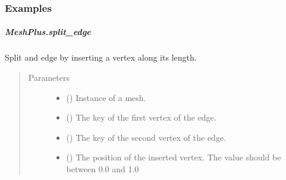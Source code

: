 \documentclass[letterpaper,10pt,english]{sphinxmanual}
\begin{document}
\begin{fulllineitems}
\begin{fulllineitems}
\subsubsection*{Examples}

\begin{sphinxVerbatim}[commandchars=\\\{\}]
\end{sphinxVerbatim}

\end{fulllineitems}



\subparagraph{MeshPlus.split\_edge}
\label{\detokenize{api/generated/directional_clustering.mesh.MeshPlus.split_edge:meshplus-split-edge}}\label{\detokenize{api/generated/directional_clustering.mesh.MeshPlus.split_edge::doc}}

\begin{fulllineitems}
\label{\detokenize{api/generated/directional_clustering.mesh.MeshPlus.split_edge:directional_clustering.mesh.MeshPlus.split_edge}}
Split and edge by inserting a vertex along its length.
\begin{quote}\begin{description}
\item[{Parameters}] \leavevmode\begin{itemize}
\item {} 
 () \textendash{} Instance of a mesh.

\item {} 
 () \textendash{} The key of the first vertex of the edge.

\item {} 
 () \textendash{} The key of the second vertex of the edge.

\item {} 
 () \textendash{} The position of the inserted vertex.
The value should be between 0.0 and 1.0


\end{itemize}
\end{description}
\end{quote}
\end{fulllineitems}
\end{fulllineitems}
\end{document}
